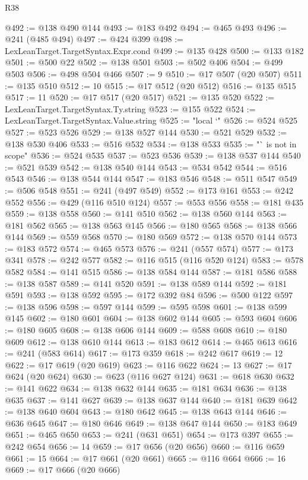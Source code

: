 \begin{lexlean}{R38}
\begin{coremodule}
@492 := @138 @490 @144
@493 := @183 @492
@494 := @465 @493
@496 := @241 (@485 @494)
@497 := @424 @399
@498 := LexLeanTarget.TargetSyntax.Expr.cond
@499 := @135 @428
@500 := @133 @182
@501 := @500 @22
@502 := @138 @501
@503 := @502 @406
@504 := @499 @503
@506 := @498 @504 @466
@507 := 9
@510 := @17 @507 (@20 @507)
@511 := @135 @510
@512 := 10
@515 := @17 @512 (@20 @512)
@516 := @135 @515
@517 := 11
@520 := @17 @517 (@20 @517)
@521 := @135 @520
@522 := LexLeanTarget.TargetSyntax.Ty.string
@523 := @155 @522
@524 := LexLeanTarget.TargetSyntax.Value.string
@525 := "local `"
@526 := @524 @525
@527 := @523 @526
@529 := @138 @527 @144
@530 := @521 @529
@532 := @138 @530 @406
@533 := @516 @532
@534 := @138 @533
@535 := "` is not in scope"
@536 := @524 @535
@537 := @523 @536
@539 := @138 @537 @144
@540 := @521 @539
@542 := @138 @540 @144
@543 := @534 @542
@544 := @516 @543
@546 := @138 @544 @144
@547 := @183 @546
@548 := @511 @547
@549 := @506 @548
@551 := @241 (@497 @549)
@552 := @173 @161
@553 := @242 @552
@556 := @429 (@116 @510 @124)
@557 := @553 @556
@558 := @181 @435
@559 := @138 @558
@560 := @141 @510
@562 := @138 @560 @144
@563 := @181 @562
@565 := @138 @563 @145
@566 := @180 @565
@568 := @138 @566 @144
@569 := @559 @568
@570 := @180 @569
@572 := @138 @570 @144
@573 := @183 @572
@574 := @465 @573
@576 := @241 (@557 @574)
@577 := @173 @341
@578 := @242 @577
@582 := @116 @515 (@116 @520 @124)
@583 := @578 @582
@584 := @141 @515
@586 := @138 @584 @144
@587 := @181 @586
@588 := @138 @587
@589 := @141 @520
@591 := @138 @589 @144
@592 := @181 @591
@593 := @138 @592
@595 := @172 @392 @84
@596 := @500 @122
@597 := @138 @596
@598 := @597 @144
@599 := @595 @598
@601 := @138 @599 @145
@602 := @180 @601
@604 := @138 @602 @144
@605 := @593 @604
@606 := @180 @605
@608 := @138 @606 @144
@609 := @588 @608
@610 := @180 @609
@612 := @138 @610 @144
@613 := @183 @612
@614 := @465 @613
@616 := @241 (@583 @614)
@617 := @173 @359
@618 := @242 @617
@619 := 12
@622 := @17 @619 (@20 @619)
@623 := @116 @622
@624 := 13
@627 := @17 @624 (@20 @624)
@630 := @623 (@116 @627 @124)
@631 := @618 @630
@632 := @141 @622
@634 := @138 @632 @144
@635 := @181 @634
@636 := @138 @635
@637 := @141 @627
@639 := @138 @637 @144
@640 := @181 @639
@642 := @138 @640 @604
@643 := @180 @642
@645 := @138 @643 @144
@646 := @636 @645
@647 := @180 @646
@649 := @138 @647 @144
@650 := @183 @649
@651 := @465 @650
@653 := @241 (@631 @651)
@654 := @173 @397
@655 := @242 @654
@656 := 14
@659 := @17 @656 (@20 @656)
@660 := @116 @659
@661 := 15
@664 := @17 @661 (@20 @661)
@665 := @116 @664
@666 := 16
@669 := @17 @666 (@20 @666)

\end{coremodule}
\end{lexlean}
